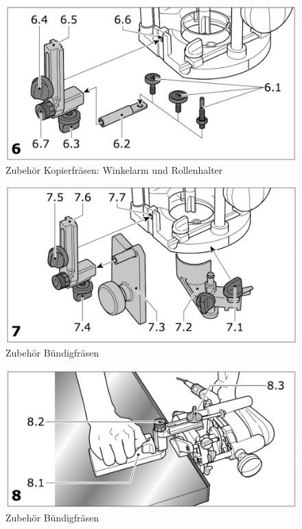 \documentclass{\basedir/fablab-document}
\begin{document}
\begin{figure}[]
	\centering
	\includegraphics[width=1\textwidth]{img/festool_8.jpg}
	\caption{Zubehör Kopierfräsen: Winkelarm und Rollenhalter}
	\label{fig:bilder7}
\end{figure}

\begin{figure}[]
	\centering
	\includegraphics[width=1\textwidth]{img/festool_9.jpg}
	\caption{Zubehör Bündigfräsen}
	\label{fig:bilder8}
\end{figure}

\begin{figure}[]
	\centering
	\includegraphics[width=1\textwidth]{img/festool_10.jpg}
	\caption{Zubehör Bündigfräsen}
	\label{fig:bilder9}
\end{figure}
\end{document}
